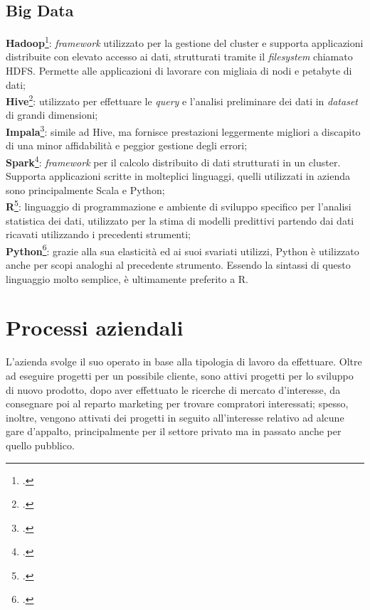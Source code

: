 \subsection{Big Data}
\textbf{Hadoop}\footcite{https://hadoop.apache.org/}: \textit{framework} utilizzato per la gestione del \gls{cluster} e supporta applicazioni distribuite con elevato accesso ai dati, strutturati tramite il \textit{filesystem} chiamato HDFS. Permette alle applicazioni di lavorare con migliaia di nodi e petabyte di dati;\\
\textbf{Hive}\footcite{https://hive.apache.org/}: utilizzato per effettuare le \textit{query} e l'analisi preliminare dei dati in \textit{dataset} di grandi dimensioni;\\
\textbf{Impala}\footcite{https://impala.apache.org/}: simile ad Hive, ma fornisce prestazioni leggermente migliori a discapito di una minor affidabilità e peggior gestione degli errori; \\
\textbf{Spark}\footcite{https://spark.apache.org/}: \textit{framework} per il calcolo distribuito di dati strutturati in un \gls{cluster}. Supporta applicazioni scritte in molteplici linguaggi, quelli utilizzati in azienda sono principalmente Scala e Python;\\
\textbf{R}\footcite{https://www.r-project.org/}: linguaggio di programmazione e ambiente di sviluppo specifico per l'analisi statistica dei dati, utilizzato per la stima di modelli predittivi partendo dai dati ricavati utilizzando i precedenti strumenti;\\
\textbf{Python}\footcite{https://www.python.org/}: grazie alla sua elasticità ed ai suoi svariati utilizzi, Python è utilizzato anche per scopi analoghi al precedente strumento. Essendo la sintassi di questo linguaggio molto semplice, è ultimamente preferito a R.\\

\section{Processi aziendali}

L'azienda svolge il suo operato in base alla tipologia di lavoro da effettuare. Oltre ad eseguire progetti per un possibile cliente, sono attivi progetti per lo sviluppo di nuovo prodotto, dopo aver effettuato le ricerche di mercato d'interesse, da consegnare poi al reparto marketing per trovare compratori interessati; spesso, inoltre, vengono attivati dei progetti in seguito all'interesse relativo ad alcune gare d'appalto, principalmente per il settore privato ma in passato anche per quello pubblico.

